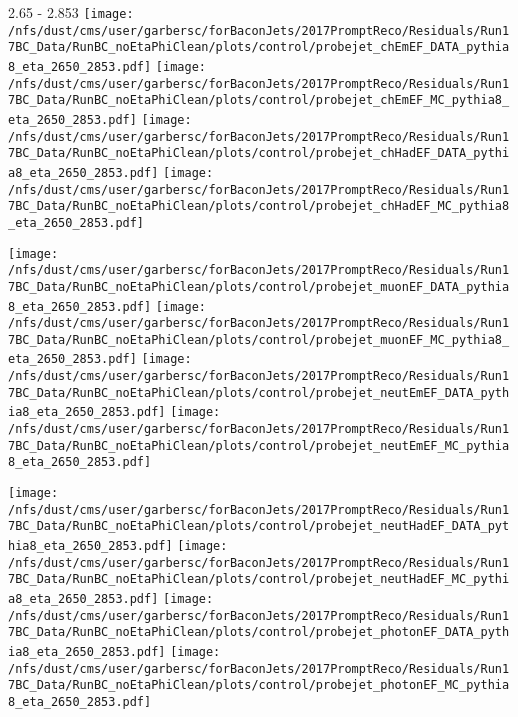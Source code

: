 \documentclass[t,compress]{beamer}
\begin{document}
\begin{frame}{2.65 - 2.853}
	\texttt{[image: /nfs/dust/cms/user/garbersc/forBaconJets/2017PromptReco/Residuals/Run17BC\_Data/RunBC\_noEtaPhiClean/plots/control/probejet\_chEmEF\_DATA\_pythia8\_eta\_2650\_2853.pdf]}
	\texttt{[image: /nfs/dust/cms/user/garbersc/forBaconJets/2017PromptReco/Residuals/Run17BC\_Data/RunBC\_noEtaPhiClean/plots/control/probejet\_chEmEF\_MC\_pythia8\_eta\_2650\_2853.pdf]}
	\texttt{[image: /nfs/dust/cms/user/garbersc/forBaconJets/2017PromptReco/Residuals/Run17BC\_Data/RunBC\_noEtaPhiClean/plots/control/probejet\_chHadEF\_DATA\_pythia8\_eta\_2650\_2853.pdf]}
	\texttt{[image: /nfs/dust/cms/user/garbersc/forBaconJets/2017PromptReco/Residuals/Run17BC\_Data/RunBC\_noEtaPhiClean/plots/control/probejet\_chHadEF\_MC\_pythia8\_eta\_2650\_2853.pdf]}
\newline

\vspace{-0.65cm}
	\texttt{[image: /nfs/dust/cms/user/garbersc/forBaconJets/2017PromptReco/Residuals/Run17BC\_Data/RunBC\_noEtaPhiClean/plots/control/probejet\_muonEF\_DATA\_pythia8\_eta\_2650\_2853.pdf]}
	\texttt{[image: /nfs/dust/cms/user/garbersc/forBaconJets/2017PromptReco/Residuals/Run17BC\_Data/RunBC\_noEtaPhiClean/plots/control/probejet\_muonEF\_MC\_pythia8\_eta\_2650\_2853.pdf]}
	\texttt{[image: /nfs/dust/cms/user/garbersc/forBaconJets/2017PromptReco/Residuals/Run17BC\_Data/RunBC\_noEtaPhiClean/plots/control/probejet\_neutEmEF\_DATA\_pythia8\_eta\_2650\_2853.pdf]}
	\texttt{[image: /nfs/dust/cms/user/garbersc/forBaconJets/2017PromptReco/Residuals/Run17BC\_Data/RunBC\_noEtaPhiClean/plots/control/probejet\_neutEmEF\_MC\_pythia8\_eta\_2650\_2853.pdf]}
\newline

\vspace{-0.65cm}
	\texttt{[image: /nfs/dust/cms/user/garbersc/forBaconJets/2017PromptReco/Residuals/Run17BC\_Data/RunBC\_noEtaPhiClean/plots/control/probejet\_neutHadEF\_DATA\_pythia8\_eta\_2650\_2853.pdf]}
	\texttt{[image: /nfs/dust/cms/user/garbersc/forBaconJets/2017PromptReco/Residuals/Run17BC\_Data/RunBC\_noEtaPhiClean/plots/control/probejet\_neutHadEF\_MC\_pythia8\_eta\_2650\_2853.pdf]}
	\texttt{[image: /nfs/dust/cms/user/garbersc/forBaconJets/2017PromptReco/Residuals/Run17BC\_Data/RunBC\_noEtaPhiClean/plots/control/probejet\_photonEF\_DATA\_pythia8\_eta\_2650\_2853.pdf]}
	\texttt{[image: /nfs/dust/cms/user/garbersc/forBaconJets/2017PromptReco/Residuals/Run17BC\_Data/RunBC\_noEtaPhiClean/plots/control/probejet\_photonEF\_MC\_pythia8\_eta\_2650\_2853.pdf]}
\end{frame}
\end{document}
